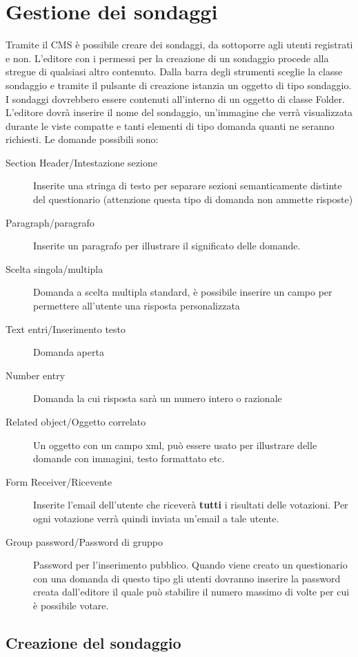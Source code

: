 \chapter[Sondaggi]{Gestione dei sondaggi}

Tramite il CMS è possibile creare dei sondaggi, da sottoporre agli utenti registrati e non. L'editore con i permessi per la creazione di un sondaggio procede alla stregue di qualsiasi altro contenuto. Dalla barra degli strumenti sceglie la classe sondaggio e tramite il pulsante di creazione istanzia un oggetto di tipo sondaggio. I sondaggi dovrebbero essere contenuti all'interno di un oggetto di classe Folder. L'editore dovrà inserire il nome del sondaggio, un'immagine che verrà visualizzata durante le viste compatte e tanti elementi di tipo domanda quanti ne seranno richiesti. Le domande possibili sono:
\begin{description}
 \item[Section Header/Intestazione sezione] Inserite una stringa di testo per separare sezioni semanticamente distinte del questionario (attenzione questa tipo di domanda non ammette risposte)
\item[Paragraph/paragrafo]Inserite un paragrafo per illustrare il significato delle domande.
\item[Scelta singola/multipla]Domanda a scelta multipla standard, è possibile inserire un campo per permettere all'utente una risposta personalizzata
\item[Text entri/Inserimento testo]Domanda aperta
\item[Number entry]Domanda la cui risposta sarà un numero intero o razionale
\item[Related object/Oggetto correlato] Un oggetto con un campo xml, può essere usato per illustrare delle domande con immagini, testo formattato etc.
\item[Form Receiver/Ricevente]Inserite l'email dell'utente che riceverà \textbf{tutti} i risultati delle votazioni. Per ogni votazione verrà quindi inviata un'email a tale utente.
\item[Group password/Password di gruppo]Password per l'inserimento pubblico. Quando viene creato un questionario con una domanda di questo tipo gli utenti dovranno inserire la password creata dall'editore il quale può stabilire il numero massimo di volte per cui è possibile votare.
\end{description}

\section{Creazione del sondaggio}


